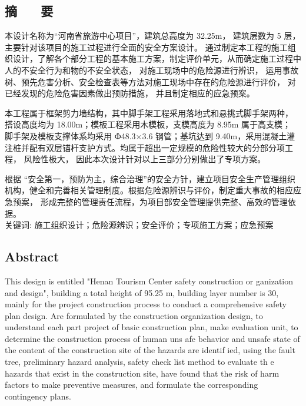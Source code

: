 \begin{center}
\section*{  \textbf{摘 ~~ 要}}
\end{center}

\vskip0.5cm
本设计名称为“河南省旅游中心项目”，建筑总高度为 32.25m， 建筑层数为 5  层，主要针对该项目的施工过程进行全面的安全方案设计。
通过制定本工程的施工组织设计，了解各个部分工程的基本施工方案，制定评价单元，从而确定施工过程中人的不安全行为和物的不安全状态，
对施工现场中的危险源进行辨识， 运用事故树、预先危害分析、安全检查表等方法对施工现场中存在的危险源进行评价， 对已经发现的危险危害因素做出预防措施，
并且制定相应的应急预案。

本工程属于框架剪力墙结构，其中脚手架工程采用落地式和悬挑式脚手架两种， 搭设高度均为 18.00m；模板工程采用木模板，支模高度为 8.95m 属于高支模；
脚手架及模板支撑体系均采用 Ф48.3×3.6 钢管；基坑达到 9.40m，采用混凝土灌注桩并配有双层锚杆支护方式。均属于超出一定规模的危险性较大的分部分项工程，
风险性极大， 因此本次设计针对以上三部分分别做出了专项方案。

根据 “安全第一，预防为主，综合治理”的安全方针，建立项目安全生产管理组织机构，健全和完善相关管理制度。根据危险源辨识与评价，制定重大事故的相应应急预案，
形成完整的管理责任流程，为项目部安全管理提供完整、高效的管理依据。\\



{ \heiti 关键词: 施工组织设计；危险源辨识；安全评价；专项施工方案；应急预案}
\pagestyle{fancy}

\clearpage
\begin{center}
    \section*{  \textbf{Abstract}}
    \end{center}


   This design is entitled "Henan Tourism Center safety construction or ganization and design", building a total height of 95.25 m, building layer number is 30, 
   mainly for the project construction process to conduct a comprehensive safety plan design. Are formulated by the construction organization design, 
   to understand each part project of basic construction plan, make evaluation unit, to determine the construction process of human uns afe behavior 
   and unsafe state of the content of the construction site of the hazards are identif ied, using the fault tree, preliminary hazard analysis, safety 
   check list method to evaluate th e hazards that exist in the construction site, have found that the risk of harm factors to make preventive measures,
    and formulate the corresponding contingency plans.

